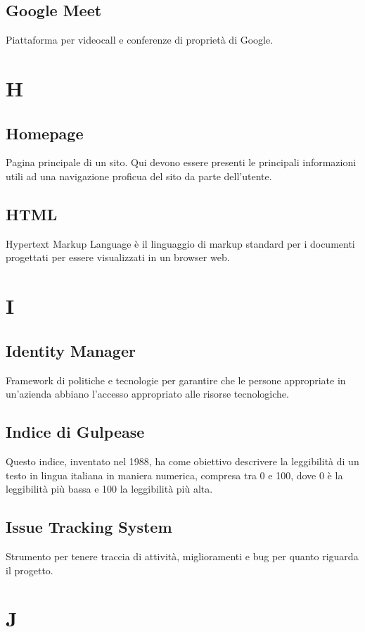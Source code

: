 \subsection*{Google Meet}
Piattaforma per videocall e conferenze di proprietà di Google.

\newpage
\section{H}
\subsection*{Homepage}
Pagina principale di un sito. Qui devono essere presenti le principali informazioni utili ad una navigazione proficua del sito da parte dell'utente.

\subsection*{HTML}
Hypertext Markup Language è il linguaggio di markup standard per i documenti progettati per essere visualizzati in un browser web.

\newpage
\section{I}
\subsection*{Identity Manager}
Framework di politiche e tecnologie per garantire che le persone appropriate in un'azienda abbiano l'accesso appropriato alle risorse tecnologiche.

\subsection*{Indice di Gulpease}
Questo indice, inventato nel 1988, ha come obiettivo descrivere la leggibilità di un
testo in lingua italiana in maniera numerica, compresa tra 0 e 100, dove 0 è la leggibilità più
bassa e 100 la leggibilità più alta.

\subsection*{Issue Tracking System}
Strumento per tenere traccia di attività, miglioramenti e bug per quanto riguarda il progetto.

\newpage
\section{J}
